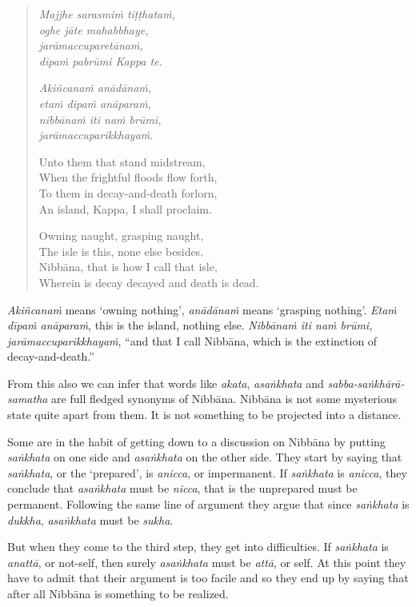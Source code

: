 \begin{quote}
\emph{Majjhe sarasmiṁ tiṭṭhataṁ,}\\
\emph{oghe jāte mahabbhaye,}\\
\emph{jarāmaccuparetānaṁ,}\\
\emph{dīpaṁ pabrūmi Kappa te.}

\emph{Akiñcanaṁ anādānaṁ,}\\
\emph{etaṁ dīpaṁ anāparaṁ,}\\
\emph{nibbānaṁ iti naṁ brūmi,}\\
\emph{jarāmaccuparikkhayaṁ}.

Unto them that stand midstream,\\
When the frightful floods flow forth,\\
To them in decay-and-death forlorn,\\
An island, Kappa, I shall proclaim.

Owning naught, grasping naught,\\
The isle is this, none else besides.\\
Nibbāna, that is how I call that isle,\\
Wherein is decay decayed and death is dead.
\end{quote}

\emph{Akiñcanaṁ} means `owning nothing', \emph{anādānaṁ} means `grasping nothing'. \emph{Etaṁ dīpaṁ anāparaṁ}, this is the island, nothing else. \emph{Nibbānaṁ iti naṁ brūmi, jarāmaccuparikkhayaṁ}, ``and that I call Nibbāna, which is the extinction of decay-and-death.''

From this also we can infer that words like \emph{akata}, \emph{asaṅkhata} and \emph{sabba-saṅkhārā-samatha} are full fledged synonyms of Nibbāna. Nibbāna is not some mysterious state quite apart from them. It is not something to be projected into a distance.

Some are in the habit of getting down to a discussion on Nibbāna by putting \emph{saṅkhata} on one side and \emph{asaṅkhata} on the other side. They start by saying that \emph{saṅkhata}, or the `prepared', is \emph{anicca}, or impermanent. If \emph{saṅkhata} is \emph{anicca}, they conclude that \emph{asaṅkhata} must be \emph{nicca}, that is the unprepared must be permanent. Following the same line of argument they argue that since \emph{saṅkhata} is \emph{dukkha}, \emph{asaṅkhata} must be \emph{sukha}.

But when they come to the third step, they get into difficulties. If \emph{saṅkhata} is \emph{anattā}, or not-self, then surely \emph{asaṅkhata} must be \emph{attā}, or self. At this point they have to admit that their argument is too facile and so they end up by saying that after all Nibbāna is something to be realized.

